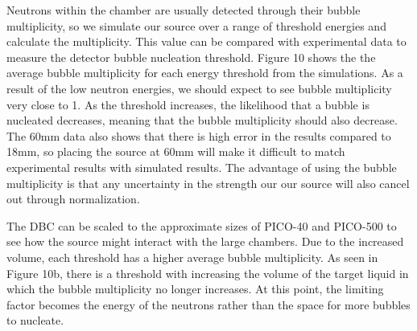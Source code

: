 \documentclass[%
12pt,
twoside,
reprint,
amsmath,amssymb,
aps,
]{article}
\begin{document}
	\par Neutrons within the chamber are usually detected through their bubble multiplicity, so we simulate our source over a range of threshold energies and calculate the multiplicity. This value can be compared with experimental data to measure the detector bubble nucleation threshold. Figure 10 shows the the average bubble multiplicity for each energy threshold from the simulations. As a result of the low neutron energies, we should expect to see bubble multiplicity very close to 1. As the threshold increases, the likelihood that a bubble is nucleated decreases, meaning that the bubble multiplicity should also decrease. The 60mm data also shows that there is high error in the results compared to 18mm, so placing the source at 60mm will make it difficult to match experimental results with simulated results. The advantage of using the bubble multiplicity is that any uncertainty in the strength our our source will also cancel out through normalization.
	\par The DBC can be scaled to the approximate sizes of PICO-40 and PICO-500 to see how the source might interact with the large chambers. Due to the increased volume, each threshold has a higher average bubble multiplicity. As seen in Figure 10b, there is a threshold with increasing the volume of the target liquid in which the bubble multiplicity no longer increases. At this point, the limiting factor becomes the energy of the neutrons rather than the space for more bubbles to nucleate.
	
\end{document}
